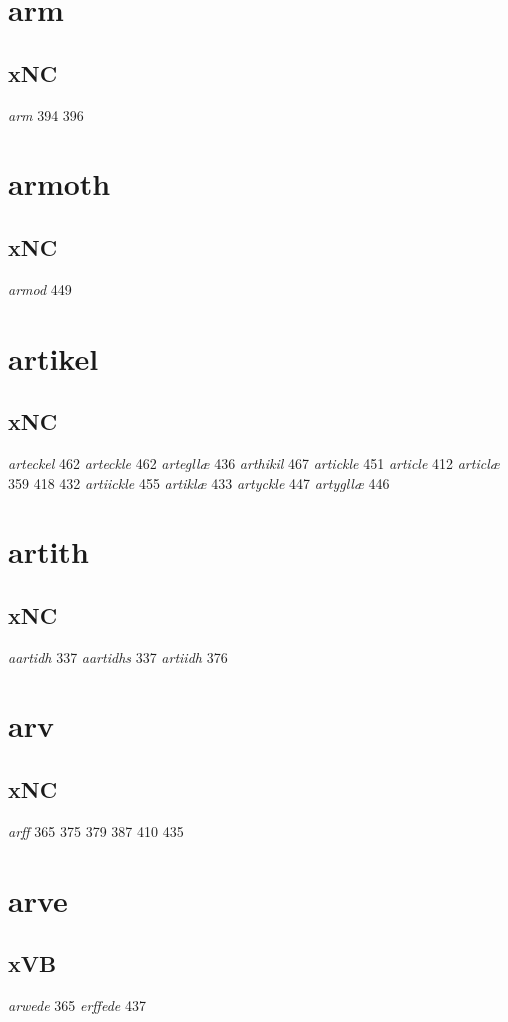 \documentclass[a4paper,twocolumn]{article}
\begin{document}
\section{arm}
\label{sec:org91a8587}
\subsection{xNC}
\label{sec:org548edb8}
\emph{arm} 394 396 
\section{armoth}
\label{sec:org86b129b}
\subsection{xNC}
\label{sec:org9131398}
\emph{armod} 449 
\section{artikel}
\label{sec:org15912fa}
\subsection{xNC}
\label{sec:org14cd7f2}
\emph{arteckel} 462 \emph{arteckle} 462 \emph{artegllæ} 436 \emph{arthikil} 467 \emph{artickle} 451 \emph{article} 412 \emph{articlæ} 359 418 432 \emph{artiickle} 455 \emph{artiklæ} 433 \emph{artyckle} 447 \emph{artygllæ} 446 
\section{artith}
\label{sec:org32b9d5f}
\subsection{xNC}
\label{sec:org7dd9861}
\emph{aartidh} 337 \emph{aartidhs} 337 \emph{artiidh} 376 
\section{arv}
\label{sec:org8225fa5}
\subsection{xNC}
\label{sec:org389c638}
\emph{arff} 365 375 379 387 410 435 
\section{arve}
\label{sec:org6d29324}
\subsection{xVB}
\label{sec:org94f3092}
\emph{arwede} 365 \emph{erffede} 437 
\end{document}

